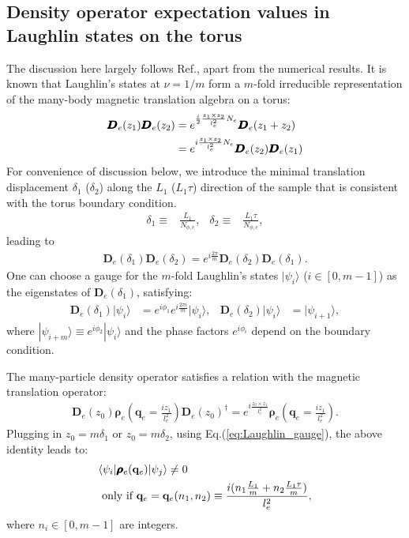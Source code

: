 \begin{subappendices}
    \section{Density operator expectation values in Laughlin states on the torus}\label{app:density_expectation}
    The discussion here largely follows Ref.\cite{wen1990ground}, apart from the numerical results. It is known that Laughlin's states at $\nu=1/m$ form a $m$-fold irreducible representation of the many-body magnetic translation algebra on a torus:
    \begin{align}
        \pmb{\bm D}_e(z_1)\pmb{\bm D}_e(z_2) & =e^{\frac{i}{2} \frac{z_1\times z_2}{l_e^2} N_e}\pmb{\bm D}_e(z_1+z_2)\notag \\
                                             & =e^{i \frac{z_1\times z_2}{l_e^2} N_e} \pmb{\bm D}_e(z_2)\pmb{\bm D}_e(z_1)
    \end{align}
    For convenience of discussion below, we introduce the minimal translation displacement $\delta_1$ ($\delta_2$) along the $L_1$ ($L_1\tau$) direction of the sample that is consistent with the torus boundary condition.
    \begin{align}
        \delta_1\equiv & \frac{L_{1}}{N_{\phi,e}}, & \delta_2\equiv & \frac{L_{1}\tau}{N_{\phi,e}},
    \end{align}
    leading to
    \begin{align}
        \pmb{\bm D}_e(\delta_1)\pmb{\bm D}_e(\delta_2)=e^{i\frac{2\pi}{m}}\pmb{\bm D}_e(\delta_2)\pmb{\bm D}_e(\delta_1).
    \end{align}
    One can choose a gauge for the $m$-fold Laughlin's states $|\psi_i\rangle$ ($i \in [0,m-1]$) as the eigenstates of $\pmb{\bm D}_e(\delta_1)$, satisfying:
    \begin{align}
        \pmb{\bm D}_e(\delta_1)|\psi_i\rangle & =e^{i\phi_1}e^{i\frac{2\pi i}{m}}|\psi_i\rangle, & \pmb{\bm D}_e(\delta_2)|\psi_i\rangle & =|\psi_{i+1}\rangle,\label{eq:Laughlin_gauge}
    \end{align}
    where $|\psi_{i+m}\rangle\equiv e^{i\phi_2}|\psi_{i}\rangle$ and the phase factors $e^{i\phi_i}$ depend on the boundary condition.

    The many-particle density operator satisfies a relation with the magnetic translation operator:
    \begin{align}
        \pmb{\bm D}_e(z_0) \pmb{\boldsymbol\rho}_e(\mathbf q_e=\frac{iz_1}{l_e^2}) \pmb{\bm D}_e(z_0)^\dagger=e^{i\frac{z_0\times z_1}{l_e^2}}\pmb{\boldsymbol\rho}_e(\mathbf q_e=\frac{iz_1}{l_e^2}).
    \end{align}
    Plugging in $z_0=m\delta_1$ or $z_0=m\delta_2$, using Eq.(\ref{eq:Laughlin_gauge}), the above identity leads to:
    \begin{align}
         & \langle \psi_i|\pmb{\boldsymbol\rho}_e(\mathbf q_e)|\psi_j\rangle\neq 0 \notag                                    \\
         & \text{ only if } \mathbf q_e=\mathbf q_e(n_1,n_2)\equiv\frac{i (n_1 \frac{L_1}{m}+ n_2\frac{L_1\tau}{m})}{l_e^2},
    \end{align}
    where $n_i\in [0,m-1]$ are integers.


\end{subappendices}
